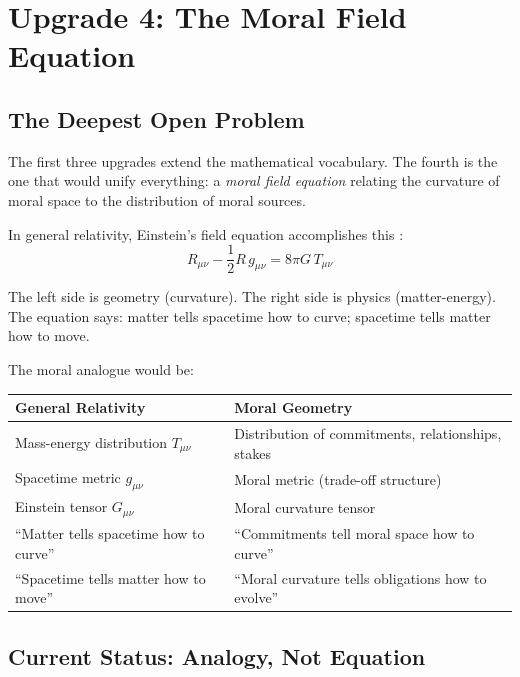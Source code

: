 \documentclass[12pt]{article}
\theoremstyle{definition}
\theoremstyle{remark}
\begin{document}
\section{Upgrade 4: The Moral Field Equation}
\label{sec:field-equation}

\subsection{The Deepest Open Problem}

The first three upgrades extend the mathematical vocabulary. The fourth is the one that would unify everything: a \emph{moral field equation} relating the curvature of moral space to the distribution of moral sources.

In general relativity, Einstein's field equation accomplishes this \citep{einstein1915}:
\begin{equation}
R_{\mu\nu} - \frac{1}{2}R\, g_{\mu\nu} = 8\pi G\, T_{\mu\nu}
\end{equation}

The left side is geometry (curvature). The right side is physics (matter-energy). The equation says: matter tells spacetime how to curve; spacetime tells matter how to move.

The moral analogue would be:

\begin{center}
\begin{tabular}{ll}
\toprule
\textbf{General Relativity} & \textbf{Moral Geometry} \\
\midrule
Mass-energy distribution $T_{\mu\nu}$ & Distribution of commitments, relationships, stakes \\
Spacetime metric $g_{\mu\nu}$ & Moral metric (trade-off structure) \\
Einstein tensor $G_{\mu\nu}$ & Moral curvature tensor \\
``Matter tells spacetime how to curve'' & ``Commitments tell moral space how to curve'' \\
``Spacetime tells matter how to move'' & ``Moral curvature tells obligations how to evolve'' \\
\bottomrule
\end{tabular}
\end{center}

\subsection{Current Status: Analogy, Not Equation}
\end{document}
